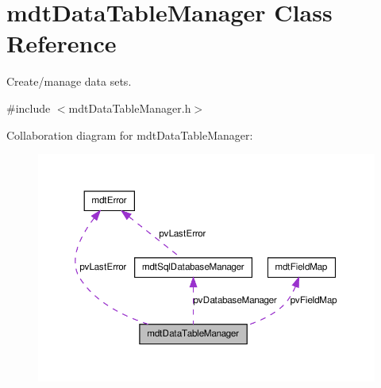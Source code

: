 \hypertarget{classmdt_data_table_manager}{
\section{mdtDataTableManager Class Reference}
\label{classmdt_data_table_manager}
}


Create/manage data sets.  




{\ttfamily \#include $<$mdtDataTableManager.h$>$}



Collaboration diagram for mdtDataTableManager:
\nopagebreak
\begin{figure}[H]
\begin{center}
\leavevmode
\includegraphics[width=364pt]{classmdt_data_table_manager__coll__graph}
\end{center}
\end{figure}
